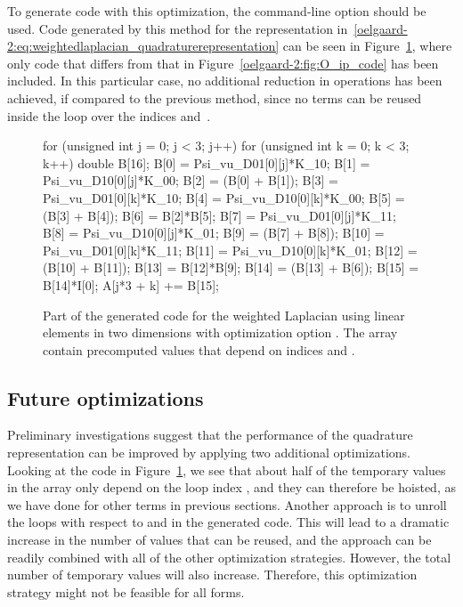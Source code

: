 To generate code with this optimization, the \ffc{}
command-line option  should
be used.  Code generated by this method for the representation
in~\eqref{oelgaard-2:eq:weightedlaplacian_quadraturerepresentation}
can be seen in Figure~\ref{oelgaard-2:fig:O_basis_code}, where only
code that differs from that in Figure~\ref{oelgaard-2:fig:O_ip_code}
has been included.  In this particular case, no additional reduction in
operations has been achieved, if compared to the previous method, since no
terms can be reused inside the loop over the indices  and~.

\begin{figure}
\bwfig
\begin{c++}
for (unsigned int j = 0; j < 3; j++)
{
  for (unsigned int k = 0; k < 3; k++)
  {
    double B[16];
    B[0] = Psi_vu_D01[0][j]*K_10;
    B[1] = Psi_vu_D10[0][j]*K_00;
    B[2] = (B[0] + B[1]);
    B[3] = Psi_vu_D01[0][k]*K_10;
    B[4] = Psi_vu_D10[0][k]*K_00;
    B[5] = (B[3] + B[4]);
    B[6] = B[2]*B[5];
    B[7] = Psi_vu_D01[0][j]*K_11;
    B[8] = Psi_vu_D10[0][j]*K_01;
    B[9] = (B[7] + B[8]);
    B[10] = Psi_vu_D01[0][k]*K_11;
    B[11] = Psi_vu_D10[0][k]*K_01;
    B[12] = (B[10] + B[11]);
    B[13] = B[12]*B[9];
    B[14] = (B[13] + B[6]);
    B[15] = B[14]*I[0];
    A[j*3 + k] += B[15];
  }
}
\end{c++}
\caption{Part of the generated code for the weighted Laplacian using
  linear elements in two dimensions with optimization option . The array  contain precomputed
  values that depend on indices  and .}
\label{oelgaard-2:fig:O_basis_code}
\end{figure}


\subsection{Future optimizations}

Preliminary investigations suggest that the performance of the
quadrature representation can be improved by applying two additional
optimizations.  Looking at the code in
Figure~\ref{oelgaard-2:fig:O_basis_code}, we see that about half of
the temporary values in the array  only depend on the loop
index , and they can therefore be hoisted, as we have done for
other terms in previous sections.  Another approach is to unroll the
loops with respect to  and  in the generated code.  This
will lead to a dramatic increase in the number of values that can be
reused, and the approach can be readily combined with all of the other
optimization strategies. However, the total number of temporary values
will also increase. Therefore, this optimization strategy might not be
feasible for all forms.

